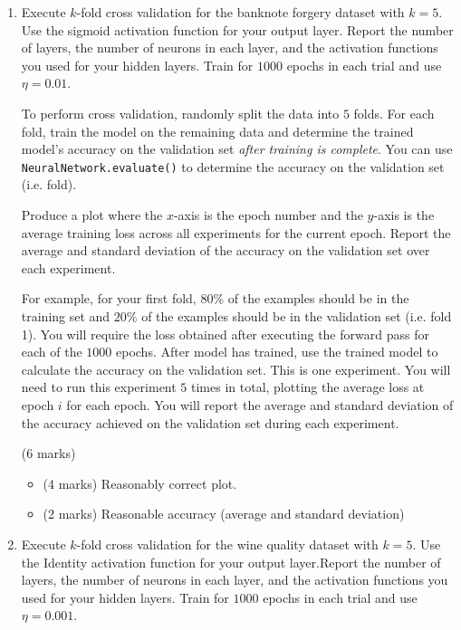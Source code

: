 \documentclass[12pt]{article}
\begin{document}
\begin{enumerate}[font=\Large,label=(\alph*)]
\item 
Execute $k$-fold cross validation for the banknote forgery dataset with $k=5$. Use the sigmoid activation function for your output layer. Report the number of layers, the number of neurons in each layer, and the activation functions you used for your hidden layers. Train for $1000$ epochs in each trial and use $\eta=0.01$.

To perform cross validation, randomly split the data into $5$ folds. For each fold, train the model on the remaining data and determine the trained model's accuracy on the validation set \textit{after training is complete}. You can use\\ \texttt{NeuralNetwork.evaluate()} to determine the accuracy on the validation set (i.e. fold). 

Produce a plot where the $x$-axis is the epoch number and the $y$-axis is the average  training loss across all experiments for the current epoch. Report the average and standard deviation of the accuracy on the validation set over each experiment.

For example, for your first fold, $80\%$ of the examples should be in the training set and $20\%$ of the examples should be in the validation set (i.e. fold 1). You will require the loss obtained after executing the forward pass for each of the $1000$ epochs. After model has trained, use the trained model to calculate the accuracy on the validation set. This is one experiment. You will need to run this experiment $5$ times in total, plotting the average loss at epoch $i$ for each epoch. You will report the average and standard deviation of the accuracy achieved on the validation set during each experiment.

\begin{markscheme}
(6 marks)

\begin{itemize}
    \item (4 marks) Reasonably correct plot.
    \item (2 marks) Reasonable accuracy (average and standard deviation)
\end{itemize}

\end{markscheme}


\item 
Execute $k$-fold cross validation for the wine quality dataset with $k=5$. Use the Identity activation function for your output layer.Report the number of layers, the number of neurons in each layer, and the activation functions you used for your hidden layers.  Train for $1000$ epochs in each trial and use $\eta=0.001$.


\end{enumerate}
\end{document}
